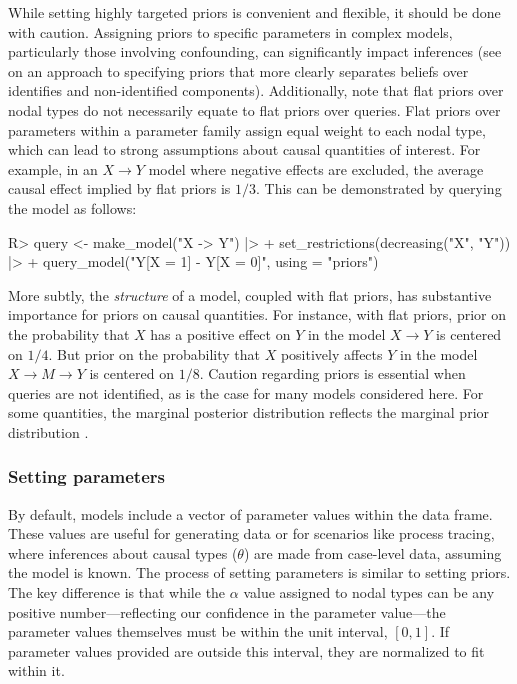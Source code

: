 \documentclass[
  11pt,
  article]{jss}
\renewcommand{\texttt}[1]{\code{#1}}
\begin{document}
While setting highly targeted priors is convenient and flexible, it
should be done with caution. Assigning priors to specific parameters in
complex models, particularly those involving confounding, can
significantly impact inferences (see \citet{richardson2011transparent}
on an approach to specifying priors that more clearly separates beliefs
over identifies and non-identified components). Additionally, note that
flat priors over nodal types do not necessarily equate to flat priors
over queries. Flat priors over parameters within a parameter family
assign equal weight to each nodal type, which can lead to strong
assumptions about causal quantities of interest. For example, in an
\(X \rightarrow Y\) model where negative effects are excluded, the
average causal effect implied by flat priors is \(1/3\). This can be
demonstrated by querying the model as follows:

\begin{CodeInput}
R> query <- make_model("X -> Y") |> 
+    set_restrictions(decreasing("X", "Y")) |>
+    query_model("Y[X = 1] - Y[X = 0]", using = "priors")
\end{CodeInput}

More subtly, the \emph{structure} of a model, coupled with flat priors,
has substantive importance for priors on causal quantities. For
instance, with flat priors, prior on the probability that \(X\) has a
positive effect on \(Y\) in the model \(X \rightarrow Y\) is centered on
\(1/4\). But prior on the probability that \(X\) positively affects
\(Y\) in the model \(X \rightarrow M \rightarrow Y\) is centered on
\(1/8\). Caution regarding priors is essential when queries are not
identified, as is the case for many models considered here. For some
quantities, the marginal posterior distribution reflects the marginal
prior distribution \citep{poirier_revising_1998}.

\subsubsection{Setting parameters}\label{parameters}

By default, models include a vector of parameter values within the
\texttt{parameters\_df} data frame. These values are useful for
generating data or for scenarios like process tracing, where inferences
about causal types (\(\theta\)) are made from case-level data, assuming
the model is known. The process of setting parameters is similar to
setting priors. The key difference is that while the \(\alpha\) value
assigned to nodal types can be any positive number---reflecting our
confidence in the parameter value---the parameter values themselves must
be within the unit interval, \([0,1]\). If parameter values provided are
outside this interval, they are normalized to fit within it.
\end{document}
